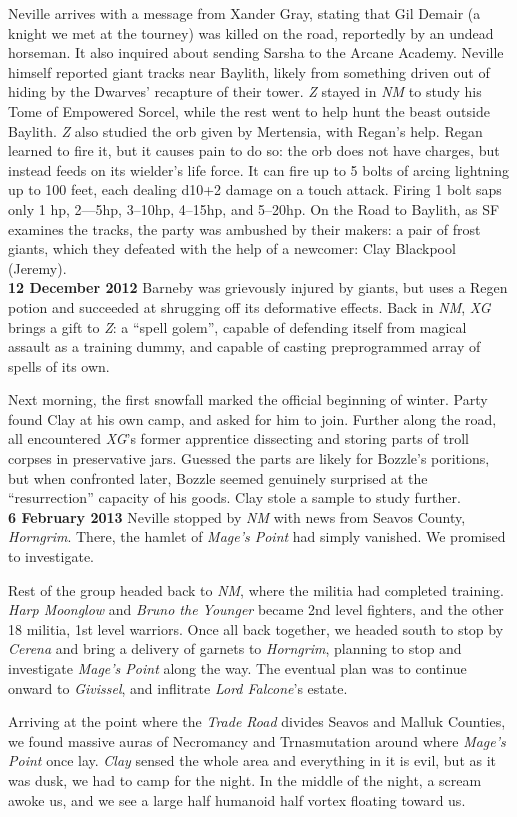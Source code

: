 \documentclass[letterpaper]{article}
\begin{document}
\noindent Neville arrives with a message from Xander Gray, stating that Gil Demair (a knight we met at the tourney) was killed on the road, reportedly by an undead horseman. It also inquired about sending Sarsha to the Arcane Academy.  Neville himself reported giant tracks near Baylith, likely from something driven out of hiding by the Dwarves' recapture of their tower.  \emph{Z} stayed in \emph{NM} to study his Tome of Empowered Sorcel, while the rest went to help hunt the beast outside Baylith. \emph{Z} also studied the orb given by Mertensia, with Regan's help.  Regan learned to fire it, but it causes pain to do so: the orb does not have charges, but instead feeds on its wielder's life force.  It can fire up to 5 bolts of arcing lightning up to 100 feet, each dealing d10+2 damage on a touch attack.  Firing 1 bolt saps only 1 hp, 2---5hp, 3--10hp, 4--15hp, and 5--20hp.  On the Road to Baylith, as SF examines the tracks, the party was ambushed by their makers: a pair of frost giants, which they defeated with the help of a newcomer: Clay Blackpool (Jeremy).  \\

\textbf{12 December 2012} Barneby was grievously injured by giants, but uses a Regen potion and succeeded at shrugging off its deformative effects. Back in \emph{NM}, \emph{XG} brings a gift to \emph{Z}: a ``spell golem'', capable of defending itself from magical assault as a training dummy, and capable of casting preprogrammed array of spells of its own.\par
Next morning, the first snowfall marked the official beginning of winter.  Party found Clay at his own camp, and asked for him to join.  Further along the road, all encountered \emph{XG}'s former apprentice dissecting and storing parts of troll corpses in preservative jars.  Guessed the parts are likely for Bozzle's poritions, but when confronted later, Bozzle seemed genuinely surprised at the ``resurrection'' capacity of his goods.  Clay stole a sample to study further. \\

\textbf{6 February 2013} Neville stopped by \emph{NM} with news from Seavos County, \emph{Horngrim}.  There, the hamlet of \emph{Mage's Point} had simply vanished.  We promised to investigate.\par
Rest of the group headed back to \emph{NM}, where the militia had completed training. \emph{Harp Moonglow} and \emph{Bruno the Younger} became 2nd level fighters, and the other 18 militia, 1st level warriors. Once all back together, we headed south to stop by \emph{Cerena} and bring a delivery of garnets to \emph{Horngrim}, planning to stop and investigate \emph{Mage's Point} along the way.  The eventual plan was to continue onward to \emph{Givissel}, and inflitrate \emph{Lord Falcone}'s estate.\par
Arriving at the point where the \emph{Trade Road} divides Seavos and Malluk Counties, we found massive auras of Necromancy and Trnasmutation around where \emph{Mage's Point} once lay. \emph{Clay} sensed the whole area and everything in it is evil, but as it was dusk, we had to camp for the night.  In the middle of the night, a scream awoke us, and we see a large half humanoid half vortex floating toward us.\\
\end{document}
